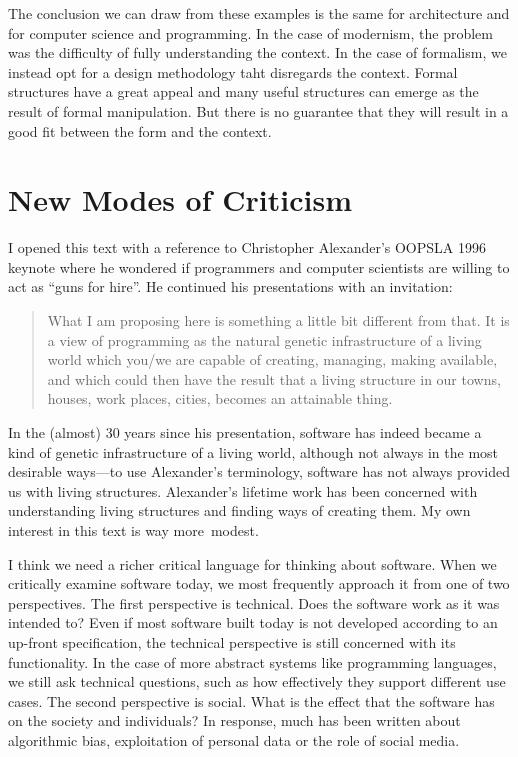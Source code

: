The conclusion we can draw from these examples is the same for architecture and
for computer science and programming. In the case of modernism, the problem was the difficulty
of fully understanding the context. In the case of formalism, we instead opt for a design
methodology taht disregards the context. Formal structures have a great appeal and
many useful structures can emerge as the result of formal manipulation. But there is no
guarantee that they will result in a good fit between the form and the context.


\section{New Modes of Criticism}

I opened this text with a reference to Christopher Alexander's OOPSLA 1996 keynote where he
wondered if programmers and computer scientists are willing to act as ``guns for hire''.
He continued his presentations with an invitation:

\begin{quote}
What I am proposing here is something a little bit different from that. It is a view of
programming as the natural genetic infrastructure of a living world which you/we are
capable of creating, managing, making available, and which could then have the result that a
living structure in our towns, houses, work places, cities, becomes an attainable thing.
\end{quote}

In the (almost) 30 years since his presentation, software has indeed became a kind of genetic
infrastructure of a living world, although not always in the most desirable ways---to use
Alexander's terminology, software has not always provided us with living structures.
Alexander's lifetime work has been concerned with understanding living structures and finding
ways of creating them. My own interest in this text is way more~modest.

I think we need a richer critical language for thinking about software. When we critically
examine software today, we most frequently approach it from one of two perspectives.
The first perspective is technical. Does the software work as it was intended to? Even if
most software built today is not developed according to an up-front specification, the technical
perspective is still concerned with its functionality. In the case of more abstract systems
like programming languages, we still ask technical questions, such as how effectively they support
different use cases. The second perspective is social. What is the effect that the software has on
the society and individuals? In response, much has been written about algorithmic bias, exploitation
of personal data or the role of social media.

